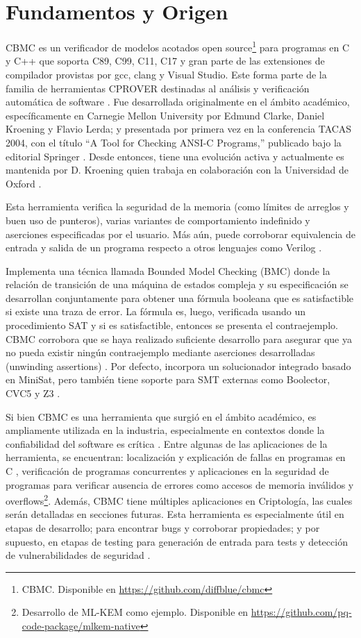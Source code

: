 \documentclass[runningheads]{llncs}
\begin{document}
\section{Fundamentos y Origen}
CBMC es un verificador de modelos acotados open source\footnote{CBMC. Disponible en \url{https://github.com/diffblue/cbmc}} para programas en C y C++ que soporta C89, C99, C11, C17 
y gran parte de las extensiones de compilador provistas por gcc, clang y Visual Studio.
Este forma parte de la familia de herramientas CPROVER destinadas al análisis y verificación automática de software \cite{cbmc-paper}.
Fue desarrollada originalmente en el ámbito académico, específicamente en Carnegie Mellon University por Edmund Clarke, Daniel Kroening y Flavio Lerda; 
y presentada por primera vez en la conferencia TACAS 2004, con el título “A Tool for Checking ANSI-C Programs,” publicado bajo la editorial Springer \cite{tacas-2004}.
Desde entonces, tiene una evolución activa y actualmente es mantenida por D. Kroening quien trabaja en colaboración con la Universidad de Oxford \cite{cbmc-paper}.

Esta herramienta verifica la seguridad de la memoria (como límites de arreglos y buen uso de punteros), varias variantes de comportamiento indefinido y aserciones
especificadas por el usuario.
Más aún, puede corroborar equivalencia de entrada y salida de un programa respecto a otros lenguajes como Verilog \cite{cbmc-website}.

Implementa una técnica llamada Bounded Model Checking (BMC) donde la relación de transición de una máquina de estados compleja y su especificación se desarrollan
conjuntamente para obtener una fórmula booleana que es satisfactible si existe una traza de error.
La fórmula es, luego, verificada usando un procedimiento SAT y si es satisfactible, entonces se presenta el contraejemplo.
CBMC corrobora que se haya realizado suficiente desarrollo para asegurar que ya no pueda existir ningún contraejemplo mediante aserciones desarrolladas (unwinding assertions) \cite{tacas-2004}.
Por defecto, incorpora un solucionador integrado basado en MiniSat, pero también tiene soporte para SMT externas como Boolector, CVC5 y Z3 \cite{cbmc-website}.

Si bien CBMC es una herramienta que surgió en el ámbito académico, es ampliamente utilizada en la industria, especialmente en contextos donde la confiabilidad 
del software es crítica \cite{cbmc-paper}.
Entre algunas de las aplicaciones de la herramienta, se encuentran: localización y explicación de fallas en programas en C \cite{fails-explanation}, verificación
de programas concurrentes \cite{cbmc-concurrent} y aplicaciones en la seguridad de programas para verificar ausencia de errores como accesos de memoria inválidos
y overflows\footnote{Desarrollo de ML-KEM como ejemplo. Disponible en \url{https://github.com/pq-code-package/mlkem-native}}.
Además, CBMC tiene múltiples aplicaciones en Criptología, las cuales serán detalladas en secciones futuras.
Esta herramienta es especialmente útil en etapas de desarrollo; para encontrar bugs y corroborar propiedades; y por supuesto, en etapas de testing para generación 
de entrada para tests y detección de vulnerabilidades de seguridad \cite{cbmc-paper}.
\end{document}
